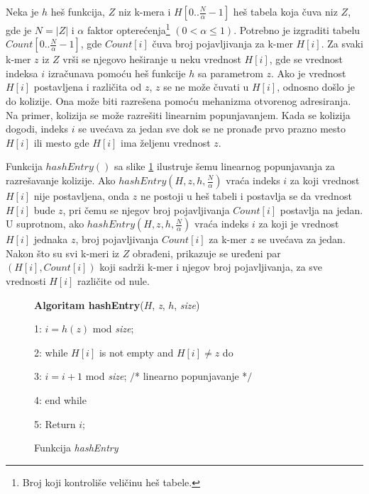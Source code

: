 \documentclass[12pt,oneside]{memoir}
\begin{document}
Neka je $h$ heš funkcija, $Z$ niz k-mera i $H[0..\frac{N}{\alpha} - 1]$ heš tabela koja čuva niz $Z$, gde je $N = |Z|$ i $\alpha$ faktor opterećenja\footnote{Broj koji kontroliše veličinu heš tabele.} $(0 < \alpha \leq 1)$. Potrebno je izgraditi tabelu $Count[0..\frac{N}{\alpha} - 1]$, gde $Count[i]$ čuva broj pojavljivanja za k-mer $H[i]$. Za svaki k-mer $z$ iz $Z$ vrši se njegovo heširanje u neku vrednost $H[i]$, gde se vrednost indeksa $i$ izračunava pomoću heš funkcije $h$ sa parametrom $z$. Ako je vrednost $H[i]$ postavljena i različita od $z$, $z$ se ne može čuvati u $H[i]$, odnosno došlo je do kolizije. Ona može biti razrešena pomoću mehanizma otvorenog adresiranja. Na primer, kolizija se može razrešiti linearnim popunjavanjem. Kada se kolizija dogodi, indeks $i$ se uvećava za jedan sve dok se ne pronađe prvo prazno mesto $H[i]$ ili mesto gde $H[i]$ ima željenu vrednost $z$.

\begin{comment}

\begin{figure}[!ht]
  \centering
  \texttt{[image: HashEntry.PNG]}
  \caption{Funkcija hashEntry \cite{WingKinSung}}
  \label{fig:hashEntry}
\end{figure}

\end{comment}

Funkcija $hashEntry()$ sa slike \ref{box:hashEntry} ilustruje šemu linearnog popunjavanja za razrešavanje kolizije. Ako $hashEntry(H, z, h, \frac{N}{\alpha})$ vraća indeks $i$ za koji vrednost $H[i]$ nije postavljena, onda $z$ ne postoji u heš tabeli i postavlja se da vrednost $H[i]$ bude $z$, pri čemu se njegov broj pojavljivanja $Count[i]$ postavlja na jedan. U suprotnom, ako $hashEntry(H, z, h, \frac{N}{\alpha})$ vraća indeks $i$ za koji je vrednost $H[i]$ jednaka $z$, broj pojavljivanja $Count[i]$ za k-mer $z$ se uvećava za jedan. Nakon što su svi k-meri iz $Z$ obrađeni, prikazuje se uređeni par $(H[i], Count[i])$ koji sadrži k-mer i njegov broj pojavljivanja, za sve vrednosti $H[i]$ različite od nule.

\begin{figure}[!ht]
\begin{tcolorbox}
\textbf{Algoritam hashEntry}($H$, \textit{z}, $h$, \textit{size})

1: $i = h(z)$ mod \textit{size};

2: while $H[i]$ is not empty and $H[i] \neq z$ do

3:\hspace{1cm} $i = i + 1$ mod \textit{size}; $/$* linearno popunjavanje *$/$

4: end while

5: Return $i$;
\end{tcolorbox}
\caption{Funkcija \textit{hashEntry} \cite{WingKinSung}}
\label{box:hashEntry}
\end{figure}
\end{document}
